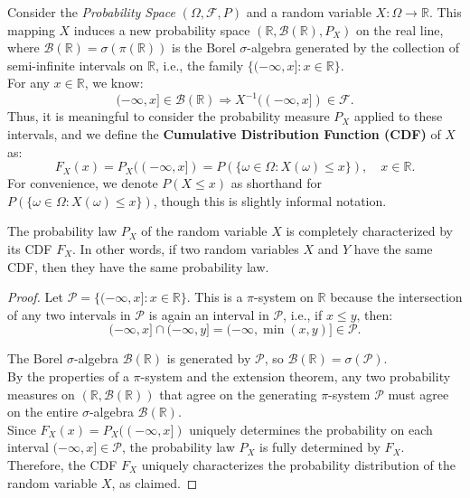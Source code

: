 Consider the \textit{Probability Space} \((\Omega, \mathcal{F}, P)\) and a random variable \(X : \Omega \to \mathbb{R}\). This mapping \(X\) induces a new probability space \((\mathbb{R}, \mathcal{B}(\mathbb{R}), P_X)\) on the real line, where \(\mathcal{B}(\mathbb{R}) = \sigma(\pi(\mathbb{R}))\) is the Borel \(\sigma\)-algebra generated by the collection of semi-infinite intervals on \(\mathbb{R}\), i.e., the family \(\{(-\infty, x] : x \in \mathbb{R}\}\).\\
  
For any \(x \in \mathbb{R}\), we know:
\[
(-\infty, x] \in \mathcal{B}(\mathbb{R}) \Rightarrow X^{-1}((-\infty, x]) \in \mathcal{F}.
\]
Thus, it is meaningful to consider the probability measure \(P_X\) applied to these intervals, and we define the \textbf{Cumulative Distribution Function (CDF)} of \(X\) as:
\[
F_X(x) = P_X((-\infty, x]) = P(\{\omega \in \Omega : X(\omega) \leq x\}), \quad x \in \mathbb{R}.
\]
For convenience, we denote \(P(X \leq x)\) as shorthand for \(P(\{\omega \in \Omega : X(\omega) \leq x\})\), though this is slightly informal notation.

\begin{theorem}
    The probability law \(P_X\) of the random variable \(X\) is completely characterized by its CDF \(F_X\). In other words, if two random variables \(X\) and \(Y\) have the same CDF, then they have the same probability law.
\end{theorem}

\begin{proof}
    Let \(\mathcal{P} = \{(-\infty, x] : x \in \mathbb{R}\}\). This is a \(\pi\)-system on \(\mathbb{R}\) because the intersection of any two intervals in \(\mathcal{P}\) is again an interval in \(\mathcal{P}\), i.e., if \(x \leq y\), then:
   \[
   (-\infty, x] \cap (-\infty, y] = (-\infty, \min(x, y)] \in \mathcal{P}.
   \]

   The Borel \(\sigma\)-algebra \(\mathcal{B}(\mathbb{R})\) is generated by \(\mathcal{P}\), so \(\mathcal{B}(\mathbb{R}) = \sigma(\mathcal{P})\).\\

   By the properties of a \(\pi\)-system and the extension theorem, any two probability measures on \((\mathbb{R}, \mathcal{B}(\mathbb{R}))\) that agree on the generating \(\pi\)-system \(\mathcal{P}\) must agree on the entire \(\sigma\)-algebra \(\mathcal{B}(\mathbb{R})\).\\

   Since \(F_X(x) = P_X((-\infty, x])\) uniquely determines the probability on each interval \((-\infty, x] \in \mathcal{P}\), the probability law \(P_X\) is fully determined by \(F_X\). Therefore, the CDF \(F_X\) uniquely characterizes the probability distribution of the random variable \(X\), as claimed.
\end{proof}

